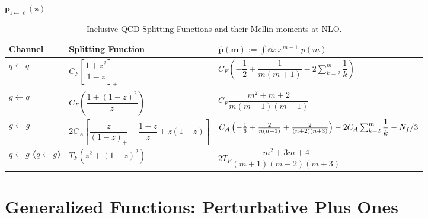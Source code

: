 \begin{subappendices}
\vspace{1em}
\begin{table}[h!]
\label{tab:inclusive-splitting}
\begin{center}
\LARGE $\boldsymbol{p_{i \leftarrow \ell}(z)}$
\end{center}
\vspace{-10pt}
\centering
\caption{
    Inclusive QCD Splitting Functions and their Mellin moments at NLO.
}
\vspace{5pt}
\renewcommand{\arraystretch}{3.5}
\begin{tabular}{|>{\bfseries}m{1.5cm}|m{6cm}|m{6cm}|}
\hline
\centering \textbf{Channel} & \centering \textbf{Splitting Function} & \centering $\boldsymbol{\hat{p}(m)} := \int \dd x\, x^{m-1} \, \, p(m)$
\tabularnewline
\hline
\centering $q \leftarrow q$
                            &
\centering $C_F \left[ \dfrac{1 + z^2}{1 - z} \right]_+$
                            &
\centering $C_F \left(-\dfrac{1}{2} + \dfrac{1}{m(m+1)} - 2\sum_{k=2}^{m} \dfrac{1}{k} \right)$
\tabularnewline
\hline
\centering $g \leftarrow q$
                            &
\centering $C_F \left( \dfrac{1 + (1 - z)^2}{z} \right)$
                            &
\centering
$C_F \dfrac{m^2 + m + 2}{m(m-1)(m+1)}$
\tabularnewline
\hline
\centering $g \leftarrow g$
                            &
\centering $2C_A \left[ \dfrac{z}{(1 - z)_+} + \dfrac{1 - z}{z} + z(1 - z) \right]$
                            &
\centering
$C_A\left(-\frac{1}{6} + \frac{2}{n(n+1)} + \frac{2}{(n+2)(n+3)}\right) - 2C_A \sum_{k=2}^{m} \dfrac{1}{k} - N_f / 3$
\tabularnewline
\hline
\centering
$q \leftarrow g$
($\overline{q} \leftarrow g$)
                            &
\centering $T_F \left( z^2 + (1 - z)^2 \right)$
                            &
\centering
$2T_F \dfrac{m^2+3m+4}{(m+1)(m+2)(m+3)}$
\tabularnewline
\hline
\end{tabular}
\end{table}





\section{Generalized Functions: Perturbative Plus Ones}
\label{app:plus-functions}


\end{subappendices}
